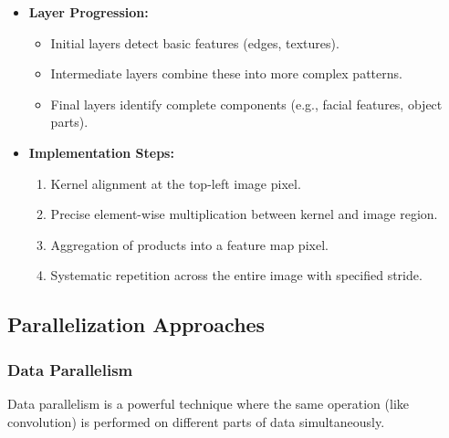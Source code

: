 \documentclass[conference, 10pt]{IEEEtran}
\begin{document}
\begin{itemize}
    \item \textbf{Layer Progression:}
    \begin{itemize}
        \item Initial layers detect basic features (edges, textures).
        \item Intermediate layers combine these into more complex patterns.
        \item Final layers identify complete components (e.g., facial features, object parts).
    \end{itemize}
    \item \textbf{Implementation Steps:}
    \begin{enumerate}
        \item Kernel alignment at the top-left image pixel.
        \item Precise element-wise multiplication between kernel and image region.
        \item Aggregation of products into a feature map pixel.
        \item Systematic repetition across the entire image with specified stride.
    \end{enumerate}
\end{itemize}

\subsection{Parallelization Approaches}
\subsubsection{Data Parallelism}
Data parallelism is a powerful technique where the same operation (like convolution) is performed on different parts of data simultaneously.
\end{document}
